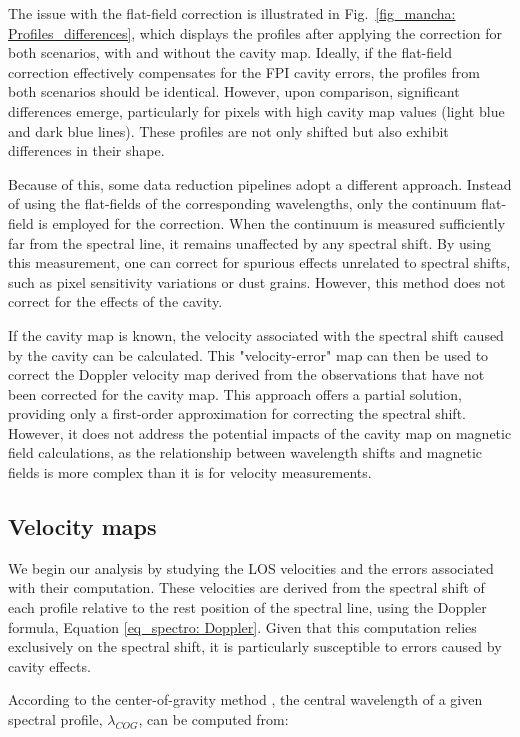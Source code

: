 The issue with the flat-field correction is illustrated in Fig.~\ref{fig_mancha: Profiles_differences}, which displays the profiles after applying the correction for both scenarios, with and without the cavity map. Ideally, if the flat-field correction effectively compensates for the FPI cavity errors, the profiles from both scenarios should be identical. However, upon comparison, significant differences emerge, particularly for pixels with high cavity map values (light blue and dark blue lines). These profiles are not only shifted but also exhibit differences in their shape. 

Because of this, some data reduction pipelines adopt a different approach. Instead of using the flat-fields of the corresponding wavelengths, only the continuum flat-field is employed for the correction. When the continuum is measured sufficiently far from the spectral line, it remains unaffected by any spectral shift. By using this measurement, one can correct for spurious effects unrelated to spectral shifts, such as pixel sensitivity variations or dust grains. However, this method does not correct for the effects of the cavity.

If the cavity map is known, the velocity associated with the spectral shift caused by the cavity can be calculated. This "velocity-error" map can then be used to correct the Doppler velocity map derived from the observations that have not been corrected for the cavity map. This approach offers a partial solution, providing only a first-order approximation for correcting the spectral shift. However, it does not address the potential impacts of the cavity map on magnetic field calculations, as the relationship between wavelength shifts and magnetic fields is more complex than it is for velocity measurements.

\subsection{\label{sect: mancha_vlos}Velocity maps}

We begin our analysis by studying the LOS velocities and the errors associated with their computation. These velocities are derived from the spectral shift of each profile relative to the rest position of the spectral line, using the Doppler formula, Equation \eqref{eq_spectro: Doppler}. Given that this computation relies exclusively on the spectral shift, it is particularly susceptible to errors caused by cavity effects.

According to the center-of-gravity method \citep{center_of_gravity}, the central wavelength of a given spectral profile, $\lambda _ {COG}$, can be computed from:

